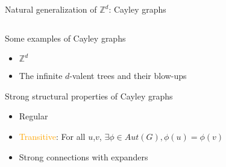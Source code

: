 \documentclass[11pt,dvipsnames,presentation,aspectratio=169]{beamer}
\newcommand{\myorange}{Orange}
\newcommand{\define}[1]{\textcolor{\myorange}{#1}}
\begin{document}
\begin{frame}{Natural generalization of $\mathbb{Z}^d$: Cayley graphs}

  \begin{columns}
    \hfill
    \begin{column}{.65\textwidth}
      \begin{exampleblock}{Some examples of Cayley graphs}
        \begin{itemize}
        \item $\mathbb{Z}^d$
        \item The infinite $d$-valent trees and their blow-ups
        \end{itemize}
      \end{exampleblock}

      \begin{block}{Strong structural properties of Cayley graphs}
        \begin{itemize}
        \item Regular
        \item \define{Transitive}: For all $u$,$v$, $\exists \phi \in Aut(G), \phi(u) = \phi(v)$
        \item Strong connections with expanders
        \end{itemize}
      \end{block}
    \end{column}
    \begin{column}{.35\textwidth}
      \begin{center}
        
        
        \vspace{.2cm}
\end{center}
\end{column}
\end{columns}
\end{frame}
\end{document}
